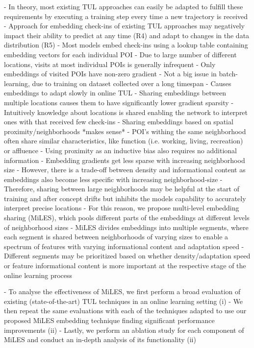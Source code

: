 \documentclass{article} %
\theoremstyle{definition}
\begin{document}
- In theory, most existing TUL approaches can easily be adapted to fulfill these requirements by executing a training step every time a new trajectory is received
- Approach for embedding check-ins of existing TUL approaches may negatively impact their ability to predict at any time (R4) and adapt to changes in the data distribution (R5)
- Most models embed check-ins using a lookup table containing embedding vectors for each individual POI
- Due to large number of different locations, visits at most individual POIs is generally infrequent \citep{chenMutualDistillationLearning2022a}
- Only embeddings of visited POIs have non-zero gradient
- Not a big issue in batch-learning, due to training on dataset collected over a long timespan
- Causes embeddings to adapt slowly in online TUL
- Sharing embeddings between multiple locations causes them to have significantly lower gradient sparsity
- Intuitively knowledge about locations is shared enabling the network to interpret ones with that received few check-ins
- Sharing embeddings based on spatial proximity/neighborhoods *makes sense*
- POI's withing the same neighborhood often share similar characteristics, like function (i.e. working, living, recreation) or affluence
- Using proximity as an inductive bias also requires no additional information
- Embedding gradients get less sparse with increasing neighborhood size
- However, there is a trade-off between density and informational content as embeddings also become less specific with increasing neighborhood-size
- Therefore, sharing between large neighborhoods may be helpful at the start of training and after concept drifts but inhibits the models capability to accurately interpret precise locations
- For this reason, we propose multi-level embedding sharing (MiLES), which pools different parts of the embeddings at different levels of neighborhood sizes
- MiLES divides embeddings into multiple segments, where each segment is shared between neighborhoods of varying sizes to enable a spectrum of features with varying informational content and adaptation speed
- Different segments may be prioritized based on whether density/adaptation speed or feature informational content is more important at the respective stage of the online learning process

- To analyse the effectiveness of MiLES, we first perform a broad evaluation of existing (state-of-the-art) TUL techniques in an online learning setting (i)
- We then repeat the same evaluations with each of the techniques adapted to use our proposed MiLES embedding technique finding significant performance improvements (ii)
- Lastly, we perform an ablation study for each component of MiLES and conduct an in-depth analysis of its functionality (ii)
\end{document}
